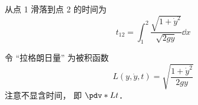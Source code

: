 

从点 1 滑落到点 2 的时间为
\begin{equation}
t_{12} = \int_1^2 \frac{\sqrt{1+\dot{y}^2}}{\sqrt{2gy}} \dd{x}
\end{equation}

令 “拉格朗日量” 为被积函数
\begin{equation}
L(y, \dot{y}, t) = \sqrt{\frac{1 + \dot{y}^2}{2gy}}
\end{equation}
注意不显含时间， 即 $\pdv*{L}{t}$．
